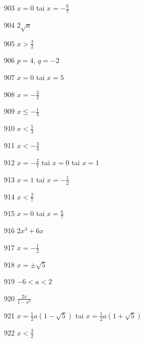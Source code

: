 \begin{Vastaus}{903}
$x=0$ tai $x=-\frac{6}{7}$
\end{Vastaus}
\begin{Vastaus}{904}
$2\sqrt{a}$
\end{Vastaus}
\begin{Vastaus}{905}
$x>\frac{3}{2}$
\end{Vastaus}
\begin{Vastaus}{906}
$p=4$, $q=-2$
\end{Vastaus}
\begin{Vastaus}{907}
$x=0$ tai $x=5$
\end{Vastaus}
\begin{Vastaus}{908}
$x=-\frac{3}{2}$
\end{Vastaus}
\begin{Vastaus}{909}
$x \leq -\frac{1}{3}$
\end{Vastaus}
\begin{Vastaus}{910}
$x<\frac{5}{3}$
\end{Vastaus}
\begin{Vastaus}{911}
$x<-\frac{3}{4}$
\end{Vastaus}
\begin{Vastaus}{912}
$x=-\frac{2}{7}$ tai $x=0$ tai $x=1$
\end{Vastaus}
\begin{Vastaus}{913}
$x=1$ tai $x=-\frac{1}{2}$
\end{Vastaus}
\begin{Vastaus}{914}
$x< \frac{2}{7} $
\end{Vastaus}
\begin{Vastaus}{915}
$x=0$ tai $x=\frac{6}{7}$
\end{Vastaus}
\begin{Vastaus}{916}
$2x^3+6x$
\end{Vastaus}
\begin{Vastaus}{917}
$x=-\frac{1}{2}$
\end{Vastaus}
\begin{Vastaus}{918}
$x=\pm \sqrt{5}$
\end{Vastaus}
\begin{Vastaus}{919}
$-6<a<2$
\end{Vastaus}
\begin{Vastaus}{920}
$\frac{2x}{1-x^2}$
\end{Vastaus}
\begin{Vastaus}{921}
$x= \frac{1}{2}a(1-\sqrt{5})$ tai $x= \frac{1}{2}a(1+\sqrt{5})$
\end{Vastaus}
\begin{Vastaus}{922}
$x<\frac{3}{2}$
\end{Vastaus}

